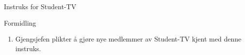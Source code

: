 \documentclass[../fsbok.tex]{subfiles}
\begin{document}
\begin{instruks*}{Instruks for Student-TV}
    \begin{instruksledd}{Formidling}
        \begin{enumerate}
            \item Gjengsjefen plikter å gjøre nye medlemmer av Student-TV kjent med denne
                instruks.
        \end{enumerate}
    \end{instruksledd}


\end{instruks*}
\end{document}
